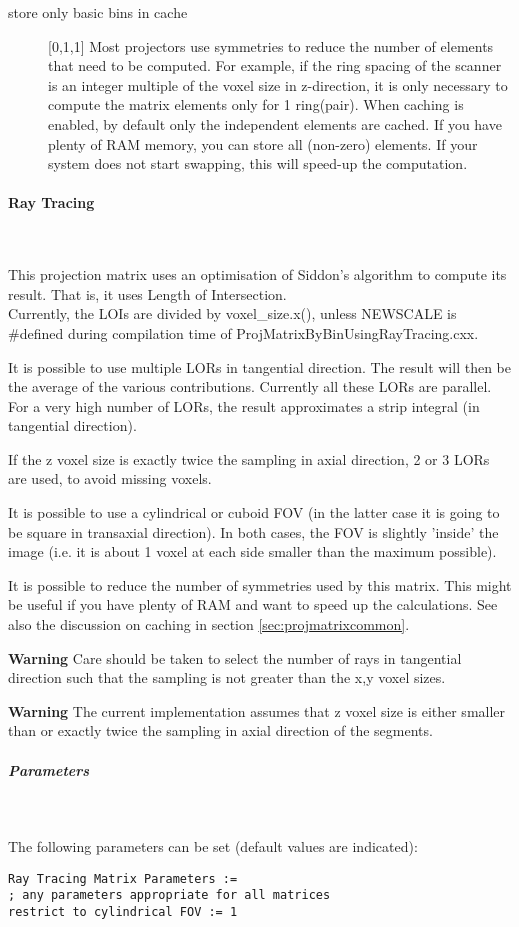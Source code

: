 \documentclass{article}
\newcommand{\subsubsubsection}[1]{\paragraph{#1}\mbox{} \\}
\newcommand{\subsubsubsubsection}[1]{\subparagraph{#1} \mbox{} \\}
\begin{document}
{{\begin{description}
\item[store only basic bins in cache] [0,1,1{]}
Most projectors use symmetries to reduce the number of elements 
that need to be computed. For example, if the ring spacing of 
the scanner is an integer multiple of the voxel size in z-direction, 
it is only necessary to compute the matrix elements only for 
1 ring(pair). When caching is enabled, by default only the independent 
elements are cached. If you have plenty of RAM memory, you can 
store all (non-zero) elements. If your system does not start 
swapping, this will speed-up the computation.
\end{description}

{ \subsubsubsection{Ray Tracing}
}
\label{sec:projmatrixusingraytracing}
This projection matrix uses an optimisation of Siddon's algorithm 
to compute its result. That is, it uses Length of Intersection.\\
Currently, the LOIs are divided by voxel\_size.x(), unless NEWSCALE 
is \#defined during compilation time of ProjMatrixByBinUsingRayTracing.cxx. 

It is possible to use multiple LORs in tangential direction. 
The result will then be the average of the various contributions. 
Currently all these LORs are parallel. For a very high number 
of LORs, the result approximates a strip integral (in tangential 
direction).

If the z voxel size is exactly twice the sampling in axial direction, 
2 or 3 LORs are used, to avoid missing voxels. 

It is possible to use a cylindrical or cuboid FOV (in the latter 
case it is going to be square in transaxial direction). In both 
cases, the FOV is slightly 'inside' the image (i.e. it is about 
1 voxel at each side smaller than the maximum possible).

It is possible to reduce the number of symmetries used by this 
matrix. This might be useful if you have plenty of RAM and want 
to speed up the calculations. See also the discussion on caching 
in section \ref{sec:projmatrixcommon}.

\textbf{Warning} Care should be taken to select the number of rays 
in tangential direction such that the sampling is not greater 
than the x,y voxel sizes.

\textbf{Warning} The current implementation assumes that z voxel size 
is either smaller than or exactly twice the sampling in axial 
direction of the segments.

{ \subsubsubsubsection{Parameters}
}
The following parameters can be set (default values are indicated):
\begin{verbatim}
Ray Tracing Matrix Parameters := 
; any parameters appropriate for all matrices
restrict to cylindrical FOV := 1


\end{verbatim}}}
\end{document}
